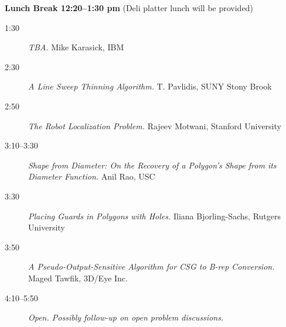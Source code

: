 {\bf Lunch Break 12:20--1:30 pm} (Deli platter lunch will be provided)

\begin{description}

\item[1:30]
{\it TBA.}
Mike Karasick,
{\sf IBM}

\item[2:30]
{\it A Line Sweep Thinning Algorithm.}
T. Pavlidis,
{\sf SUNY Stony Brook}

\item[2:50]
{\it The Robot Localization Problem.}
Rajeev Motwani,
{\sf Stanford University}

\item[3:10--3:30]
{\it Shape from Diameter: On the Recovery of
a Polygon's Shape from its Diameter Function.}
Anil Rao, {\sf USC}

\item[3:30]
{\it Placing Guards in Polygons with Holes.}
Iliana Bjorling-Sachs,
{\sf Rutgers University}

\item[3:50]
{\it A Pseudo-Output-Sensitive Algorithm for CSG to B-rep Conversion.}
Maged Tawfik, 
{\sf 3D/Eye Inc.}

\item[4:10--5:50]
{\it Open. Possibly follow-up on open problem discussions.}

\end{description}



